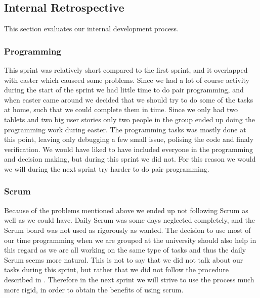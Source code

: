 \subsection{Internal Retrospective}\label{internal2}
This section evaluates our internal development process.
\subsubsection{Programming}
This sprint was relatively short compared to the first sprint, and it overlapped with easter which causeed some problems. 
Since we had a lot of course activity during the start of the sprint we had little time to do pair programming, and when easter came around we decided that we should try to do some of the tasks at home, such that we could complete them in time. 
Since we only had two tablets and two big user stories only two people in the group ended up doing the programming work during easter.
The programming tasks was mostly done at this point, leaving only debugging a few small issue, polising the code and finaly verification. 
We would have liked to have included everyone in the programming and decision making, but during this sprint we did not. 
For this reason we would we will during the next sprint try harder to do pair programming. 

\subsubsection{Scrum}
Because of the problems mentioned above we ended up not following Scrum as well as we could have.
Daily Scrum was some days neglected completely, and the Scrum board was not used as rigorously as wanted.
The decision to use most of our time programming when we are grouped at the university should also help in this regard as we are all working on the same type of tasks and thus the daily Scrum seems more natural.
This is not to say that we did not talk about our tasks during this sprint, but rather that we did not follow the procedure described in .
Therefore in the next sprint we will strive to use the process much more rigid, in order to obtain the benefits of using scrum.
